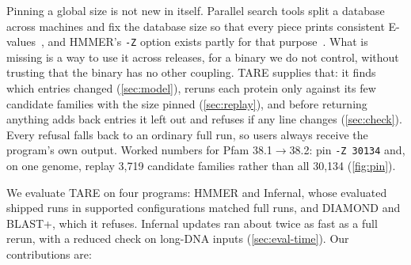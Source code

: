 \documentclass[letterpaper,twocolumn,10pt]{article}
\theoremstyle{definition}
\newcommand{\sys}{TARE\xspace}
\newcommand{\sys}{PARE\xspace}
\begin{document}
Pinning a global size is not new in itself. Parallel search tools split a database across machines and fix the
database size so that every piece prints consistent E-values~\cite{darling2003mpiblast}, and HMMER's \texttt{-Z} option
exists partly for that purpose~\cite{eddy2011hmmer}. What is missing is a way to use it across releases, for a binary we
do not control, without trusting that the binary has no other coupling. \sys supplies that: it finds which entries
changed (\cref{sec:model}), reruns each protein only against its few candidate families with the size pinned
(\cref{sec:replay}), and before returning anything adds back entries it left out and refuses if any line changes
(\cref{sec:check}). Every refusal falls back to an ordinary full run, so users always receive the program's own output.
Worked numbers for Pfam 38.1$\rightarrow$38.2: pin \texttt{-Z 30134} and, on one genome, replay 3{,}719 candidate families rather than all 30{,}134 (\cref{fig:pin}).

We evaluate \sys on four programs: HMMER and Infernal, whose evaluated shipped runs in supported configurations matched full runs, and DIAMOND and BLAST+,
which it refuses. Infernal updates ran about twice as fast as a full rerun, with a reduced check on long\nobreakdash-DNA inputs
(\cref{sec:eval-time}). Our contributions are:
\end{document}
